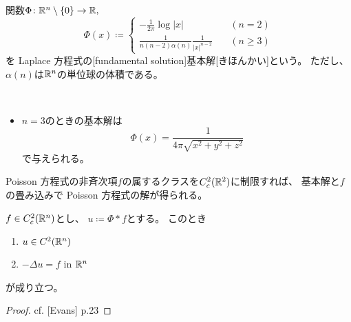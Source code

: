 \documentclass[report]{jlreq}
\begin{document}
\begin{definition}[基本解]
    関数$\Phi \colon \mathbb{R}^n \setminus \{0\} \to \mathbb{R},$
    \begin{equation}
        \Phi(x) \coloneqq \begin{cases}
            - \frac{1}{2\pi} \log |x| &\quad (n = 2) \\
            \frac{1}{n(n-2)\alpha(n)} \frac{1}{|x|^{n-2}} &\quad (n \ge 3)
        \end{cases}
    \end{equation}
    を Laplace 方程式の[fundamental solution]{基本解}[きほんかい]という。
    ただし、$\alpha(n)$は$\mathbb{R}^n$の単位球の体積である。
\end{definition}

\begin{example}[基本解の例]
    ~
    \begin{itemize}
        \item $n = 3$のときの基本解は
            \begin{equation}
                \Phi(x) = \frac{1}{4\pi \sqrt{x^2 + y^2 + z^2}}
            \end{equation}
            で与えられる。
    \end{itemize}
\end{example}

Poisson 方程式の非斉次項$f$の属するクラスを$C_c^2(\mathbb{R}^2)$に制限すれば、
基本解と$f$の畳み込みで Poisson 方程式の解が得られる。

\begin{theorem}
    $f \in C_c^2(\mathbb{R}^n)$とし、
    $u \coloneqq \Phi * f$とする。
    このとき
    \begin{enumerate}
        \item $u \in C^2(\mathbb{R}^n)$
        \item $- \Delta u = f$ in $\mathbb{R}^n$
    \end{enumerate}
    が成り立つ。
\end{theorem}

\begin{proof}
    cf. [Evans] p.23
\end{proof}

\end{document}
